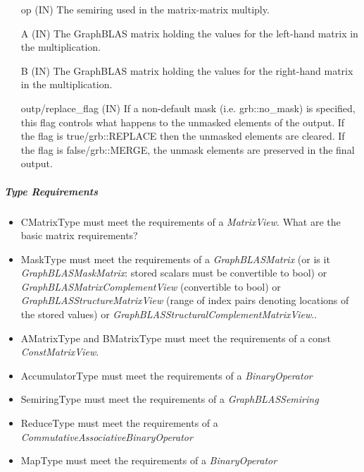 \begin{itemize}[leftmargin=1.1in]
    \item[{\sf op}]   ({\sf IN}) The semiring used in the matrix-matrix
    multiply.

    \item[{\sf A}]    ({\sf IN}) The GraphBLAS matrix holding the values
    for the left-hand matrix in the multiplication.

    \item[{\sf B}]    ({\sf IN}) The GraphBLAS matrix holding the values for
    the right-hand matrix in the multiplication.

    \item[{\sf outp/replace\_flag}] ({\sf IN}) If a non-default mask (i.e. {\sf grb::no\_mask}) is specified,
    this flag controls what happens to the unmasked elements of the output.  If the flag is {\sf true/grb::REPLACE}
    then the unmasked elements are cleared.  If the flag is {\sf false/grb::MERGE}, the unmask elements are preserved in the final output. \\
\end{itemize}

\subparagraph{Type Requirements}

\begin{itemize}[leftmargin=1.1in]
    \item {\sf CMatrixType} must meet the requirements of a \textit{MatrixView}.  What are the basic matrix requirements?
    \item {\sf MaskType} must meet the requirements of a \emph{GraphBLASMatrix} (or is it \emph{GraphBLASMaskMatrix}: stored scalars must be convertible to bool) or \emph{GraphBLASMatrixComplementView} (convertible to bool) or \emph{GraphBLASStructureMatrixView} (range of index pairs denoting locations of the stored values) or  \emph{GraphBLASStructuralComplementMatrixView}..
    \item {\sf AMatrixType} and {\sf BMatrixType} must meet the requirements of a const \textit{ConstMatrixView}.
    \item {\sf AccumulatorType} must meet the requirements of a \emph{BinaryOperator}
    \item {\sf SemiringType} must meet the requirements of a \emph{GraphBLASSemiring}
    \item {\sf ReduceType} must meet the requirements of a \emph{CommutativeAssociativeBinaryOperator}
    \item {\sf MapType} must meet the requirements of a \emph{BinaryOperator}
\end{itemize}

